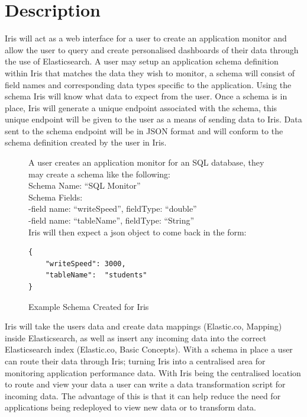 \documentclass[12pt,a4paper,titlepage]{report}
\newcommand{\q}[1]{``#1''}
\begin{document}
\section{Description}
Iris will act as a web interface for a user to create an application monitor and allow the user to query and create personalised dashboards of their data through the use of Elasticsearch. A user may setup an application schema definition within Iris that matches the data they wish to monitor, a schema will consist of field names and corresponding data types specific to the application. Using the schema Iris will know what data to expect from the user. Once a schema is in place, Iris will generate a unique endpoint associated with the schema, this unique endpoint will be given to the user as a means of sending data to Iris. Data sent to the schema endpoint will be in JSON format and will conform to the schema definition created by the user in Iris.
\begin{figure}[H]
\begin{tcolorbox}
A user creates an application monitor for an SQL database, they may create a schema like the following:
\\
Schema Name: \q{SQL Monitor}
\\
Schema Fields: 
\\
	-field name: \q{writeSpeed}, fieldType: \q{double}
\\
	-field name: \q{tableName}, fieldType: \q{String}
\\
Iris will then expect a json object to come back in the form:
\begin{verbatim}
{
	"writeSpeed": 3000,
	"tableName":  "students"
}
\end{verbatim}
\end{tcolorbox}
\caption{Example Schema Created for Iris}
\end{figure}

Iris will take the users data and create data mappings (Elastic.co, Mapping) inside Elasticsearch, as well as insert any incoming data into the correct Elasticsearch index (Elastic.co, Basic Concepts). With a schema in place a user can route their data through Iris; turning Iris into a centralised area for monitoring application performance data. With Iris being the centralised location to route and view your data a user can write a data transformation script for incoming data. The advantage of this is that it can help reduce the need for applications being redeployed to view new data or to transform data.
\end{document}
